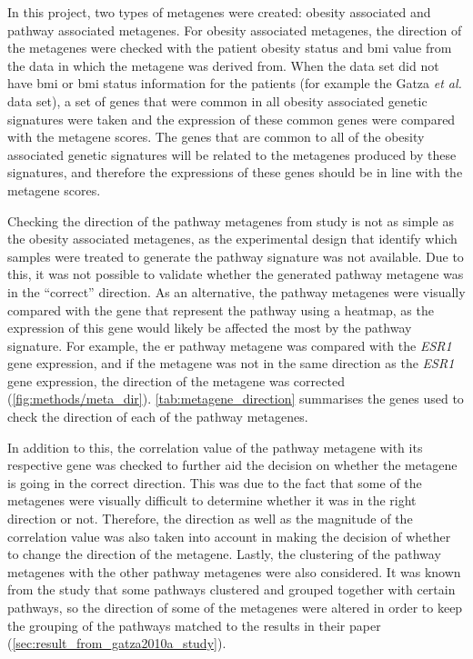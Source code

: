 In this project, two types of metagenes were created: obesity associated and pathway associated metagenes.
For obesity associated metagenes, the direction of the metagenes were checked with the patient obesity status and \gls{bmi} value from the data in which the metagene was derived from.
When the data set did not have \gls{bmi} or \gls{bmi} status information for the patients (for example the Gatza \textit{et al.} data set), a set of genes that were common in all obesity associated genetic signatures were taken and the expression of these common genes were compared with the metagene scores.
The genes that are common to all of the obesity associated genetic signatures will be related to the metagenes produced by these signatures, and therefore the expressions of these genes should be in line with the metagene scores.

Checking the direction of the pathway metagenes from \citet{Gatza2010a} study is not as simple as the obesity associated metagenes, as the experimental design that identify which samples were treated to generate the pathway signature was not available.
Due to this, it was not possible to validate whether the generated pathway metagene was in the ``correct'' direction.
As an alternative, the pathway metagenes were visually compared with the gene that represent the pathway using a heatmap, as the expression of this gene would likely be affected the most by the pathway signature.
For example, the \gls{er} pathway metagene was compared with the \textit{ESR1} gene expression, and if the metagene was not in the same direction as the \textit{ESR1} gene expression, the direction of the metagene was corrected (\cref{fig:methods/meta_dir}).
\cref{tab:metagene_direction} summarises the genes used to check the direction of each of the pathway metagenes.

In addition to this, the correlation value of the pathway metagene with its respective gene was checked to further aid the decision on whether the metagene is going in the correct direction.
This was due to the fact that some of the metagenes were visually difficult to determine whether it was in the right direction or not.
Therefore, the direction as well as the magnitude of the correlation value was also taken into account in making the decision of whether to change the direction of the metagene.
Lastly, the clustering of the pathway metagenes with the other pathway metagenes were also considered.
It was known from the \citet{Gatza2010a} study that some pathways clustered and grouped together with certain pathways, so the direction of some of the metagenes were altered in order to keep the grouping of the pathways matched to the results in their paper (\cref{sec:result_from_gatza2010a_study}).

